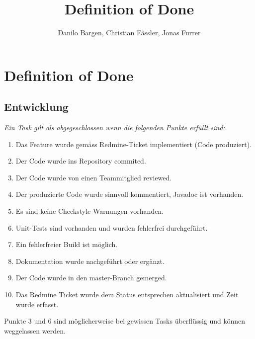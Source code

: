 \documentclass[10pt,a4paper]{scrartcl}
\author{Danilo Bargen, Christian Fässler, Jonas Furrer}
\title{Definition of Done}
\begin{document}
\section*{Definition of Done}

\subsection*{Entwicklung}

\textit{Ein Task gilt als abgegeschlossen wenn die folgenden Punkte erfüllt sind:}
\begin{enumerate}
\item Das Feature wurde gemäss Redmine-Ticket implementiert (Code produziert).
\item Der Code wurde ins Repository commited.
\item Der Code wurde von einen Teammitglied reviewed.
\item Der produzierte Code wurde sinnvoll kommentiert, Javadoc ist vorhanden.
\item Es sind keine Checkstyle-Warnungen vorhanden.
\item Unit-Tests sind vorhanden und wurden fehlerfrei durchgeführt.
\item Ein fehlerfreier Build ist möglich.
\item Dokumentation wurde nachgeführt oder ergänzt.
\item Der Code wurde in den master-Branch gemerged.
\item Das Redmine Ticket wurde dem Status entsprechen aktualisiert und Zeit wurde erfasst.
\end{enumerate}
Punkte 3 und 6 sind möglicherweise bei gewissen Tasks überflüssig und können weggelassen werden.
\end{document}
